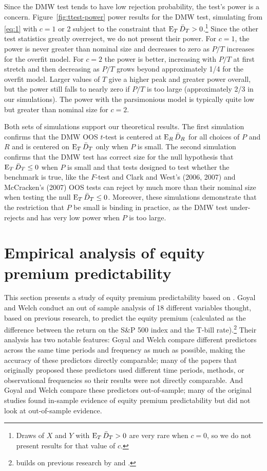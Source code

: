 \documentclass[12pt,draft]{article}
\begin{document}
Since the DMW test tends to have low rejection probability, the test's
power is a concern.  Figure~\ref{fig:ttest-power} power results for
the DMW test, simulating from \eqref{eq:1} with $c = 1$ or 2 subject
to the constraint that $\operatorname{E}_T \bar{D}_{T} > 0$.\footnote{%
  Draws of $X$ and $Y$ with $\operatorname{E}_T \bar{D}_{T} > 0$ are very rare when $c=0$,
  so we do not present results for that value of $c$.} %
Since the other test statistics greatly overreject, we do not present
their power.  For $c=1$, the power is never greater than nominal size
and decreases to zero as $P/T$ increases for the overfit model.  For
$c=2$ the power is better, increasing with $P/T$ at first stretch and
then decreasing as $P/T$ grows beyond approximately 1/4 for the
overfit model.  Larger values of $T$ give a higher peak and greater
power overall, but the power still falls to nearly zero if $P/T$ is
too large (approximately 2/3 in our simulations).  The power with the
parsimonious model is typically quite low but greater than nominal
size for $c = 2$.

Both sets of simulations support our theoretical results.  The first
simulation confirms that the DMW OOS $t$-test is centered at $\operatorname{E}_R
\bar{D}_{R}$ for all choices of $P$ and $R$ and is centered on $\operatorname{E}_T \bar{D}_{T}$
only when $P$ is small.  The second simulation confirms that the DMW
test has correct size for the null hypothesis that $\operatorname{E}_T \bar{D}_{T} \leq 0$
when $P$ is small and that tests designed to test whether the
benchmark is true, like the $F$-test and Clark and West's (2006, 2007)
and McCracken's (2007) OOS tests can reject by much more than their
nominal size when testing the null $\operatorname{E}_T \bar{D}_{T} \leq 0$.  Moreover,
these simulations demonstrate that the restriction that $P$ be small
is binding in practice, as the DMW test under-rejects and has very low
power when $P$ is too large.

\section{Empirical analysis of equity premium predictability}
\label{sec:empirics}

This section presents a study of equity premium predictability based
on \citet{GoW:08}. Goyal and Welch conduct an out of sample analysis
of 18 different variables thought, based on previous research, to
predict the equity premium (calculated as the difference between the
return on the S\&P 500 index and the T-bill rate).\footnote{%
  \citet{GoW:08} builds on previous research by \citet{BoH:99} and
  \cite{GoW:03}.} %
Their analysis has two notable features: Goyal and Welch compare different
predictors across the same time periods and frequency as much as
possible, making the accuracy of these predictors directly comparable;
many of the papers that originally proposed these predictors used
different time periods, methods, or observational frequencies so their
results were not directly comparable. And Goyal and Welch compare
these predictors out-of-sample; many of the original studies found
in-sample evidence of equity premium predictability but did not look
at out-of-sample evidence.
\end{document}
